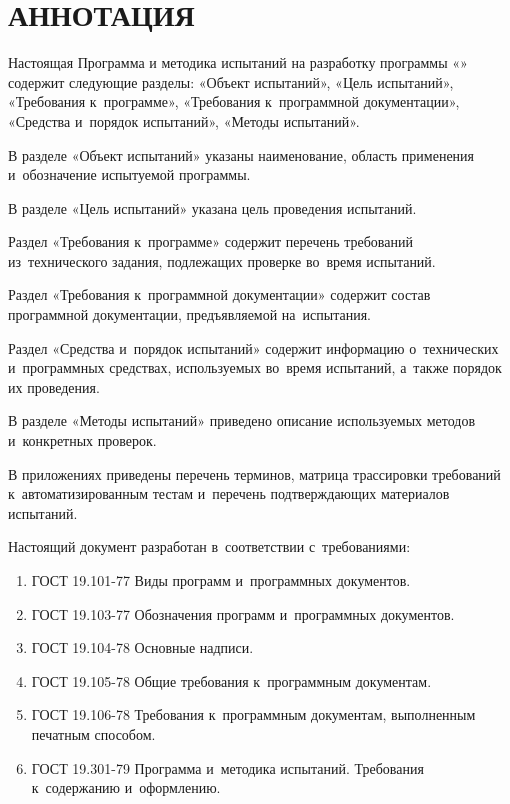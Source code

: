 \documentclass[12pt,a4paper]{extarticle}
\begin{document}
\sloppy




\section*{АННОТАЦИЯ}

Настоящая Программа и методика испытаний на разработку программы «\hseProjectName» содержит следующие разделы: «Объект испытаний», «Цель испытаний», «Требования к~программе», «Требования к~программной документации», «Средства и~порядок испытаний», «Методы испытаний».

В разделе «Объект испытаний» указаны наименование, область применения и~обозначение испытуемой программы.

В разделе «Цель испытаний» указана цель проведения испытаний.

Раздел «Требования к~программе» содержит перечень требований из~технического задания, подлежащих проверке во~время испытаний.

Раздел «Требования к~программной документации» содержит состав программной документации, предъявляемой на~испытания.

Раздел «Средства и~порядок испытаний» содержит информацию о~технических и~программных средствах, используемых во~время испытаний, а~также порядок их проведения.

В разделе «Методы испытаний» приведено описание используемых методов и~конкретных проверок.

В приложениях приведены перечень терминов, матрица трассировки требований к~автоматизированным тестам и~перечень подтверждающих материалов испытаний.

\clearpage

\noindent
Настоящий документ разработан в~соответствии с~требованиями:

\begin{enumerate}[label=\arabic*), leftmargin=1.25cm]
\item ГОСТ 19.101-77 Виды программ и~программных документов\cite{gost19101}.
\item ГОСТ 19.103-77 Обозначения программ и~программных документов\cite{gost19103}.
\item ГОСТ 19.104-78 Основные надписи\cite{gost19104}.
\item ГОСТ 19.105-78 Общие требования к~программным документам\cite{gost19105}.
\item ГОСТ 19.106-78 Требования к~программным документам, выполненным
      печатным способом\cite{gost19106}.
\item ГОСТ 19.301-79 Программа и~методика испытаний. Требования
      к~содержанию и~оформлению\cite{gost19301}.
\end{enumerate}
\end{document}
